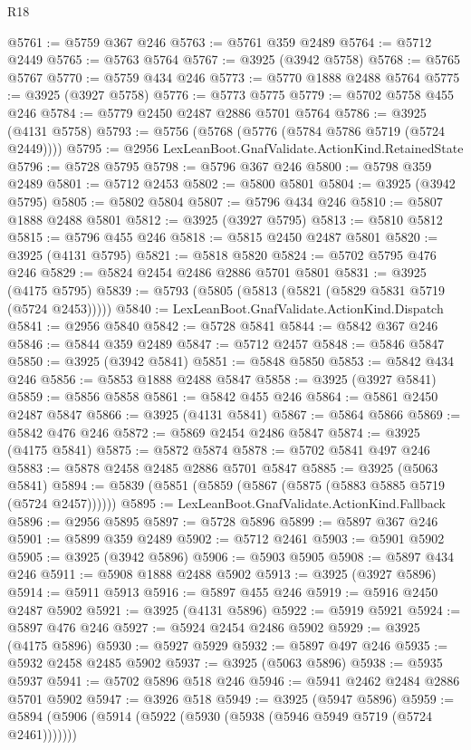 \begin{lexlean}{R18}
\begin{coremodule}
{{{{{{{{{{{{{{{{{{{@5761 := @5759 @367 @246
@5763 := @5761 @359 @2489
@5764 := @5712 @2449
@5765 := @5763 @5764
@5767 := @3925 (@3942 @5758)
@5768 := @5765 @5767
@5770 := @5759 @434 @246
@5773 := @5770 @1888 @2488 @5764
@5775 := @3925 (@3927 @5758)
@5776 := @5773 @5775
@5779 := @5702 @5758 @455 @246
@5784 := @5779 @2450 @2487 @2886 @5701 @5764
@5786 := @3925 (@4131 @5758)
@5793 := @5756 (@5768 (@5776 (@5784 @5786 @5719 (@5724 @2449))))
@5795 := @2956 LexLeanBoot.GnafValidate.ActionKind.RetainedState
@5796 := @5728 @5795
@5798 := @5796 @367 @246
@5800 := @5798 @359 @2489
@5801 := @5712 @2453
@5802 := @5800 @5801
@5804 := @3925 (@3942 @5795)
@5805 := @5802 @5804
@5807 := @5796 @434 @246
@5810 := @5807 @1888 @2488 @5801
@5812 := @3925 (@3927 @5795)
@5813 := @5810 @5812
@5815 := @5796 @455 @246
@5818 := @5815 @2450 @2487 @5801
@5820 := @3925 (@4131 @5795)
@5821 := @5818 @5820
@5824 := @5702 @5795 @476 @246
@5829 := @5824 @2454 @2486 @2886 @5701 @5801
@5831 := @3925 (@4175 @5795)
@5839 := @5793 (@5805 (@5813 (@5821 (@5829 @5831 @5719 (@5724 @2453)))))
@5840 := LexLeanBoot.GnafValidate.ActionKind.Dispatch
@5841 := @2956 @5840
@5842 := @5728 @5841
@5844 := @5842 @367 @246
@5846 := @5844 @359 @2489
@5847 := @5712 @2457
@5848 := @5846 @5847
@5850 := @3925 (@3942 @5841)
@5851 := @5848 @5850
@5853 := @5842 @434 @246
@5856 := @5853 @1888 @2488 @5847
@5858 := @3925 (@3927 @5841)
@5859 := @5856 @5858
@5861 := @5842 @455 @246
@5864 := @5861 @2450 @2487 @5847
@5866 := @3925 (@4131 @5841)
@5867 := @5864 @5866
@5869 := @5842 @476 @246
@5872 := @5869 @2454 @2486 @5847
@5874 := @3925 (@4175 @5841)
@5875 := @5872 @5874
@5878 := @5702 @5841 @497 @246
@5883 := @5878 @2458 @2485 @2886 @5701 @5847
@5885 := @3925 (@5063 @5841)
@5894 := @5839 (@5851 (@5859 (@5867 (@5875 (@5883 @5885 @5719 (@5724 @2457))))))
@5895 := LexLeanBoot.GnafValidate.ActionKind.Fallback
@5896 := @2956 @5895
@5897 := @5728 @5896
@5899 := @5897 @367 @246
@5901 := @5899 @359 @2489
@5902 := @5712 @2461
@5903 := @5901 @5902
@5905 := @3925 (@3942 @5896)
@5906 := @5903 @5905
@5908 := @5897 @434 @246
@5911 := @5908 @1888 @2488 @5902
@5913 := @3925 (@3927 @5896)
@5914 := @5911 @5913
@5916 := @5897 @455 @246
@5919 := @5916 @2450 @2487 @5902
@5921 := @3925 (@4131 @5896)
@5922 := @5919 @5921
@5924 := @5897 @476 @246
@5927 := @5924 @2454 @2486 @5902
@5929 := @3925 (@4175 @5896)
@5930 := @5927 @5929
@5932 := @5897 @497 @246
@5935 := @5932 @2458 @2485 @5902
@5937 := @3925 (@5063 @5896)
@5938 := @5935 @5937
@5941 := @5702 @5896 @518 @246
@5946 := @5941 @2462 @2484 @2886 @5701 @5902
@5947 := @3926 @518
@5949 := @3925 (@5947 @5896)
@5959 := @5894 (@5906 (@5914 (@5922 (@5930 (@5938 (@5946 @5949 @5719 (@5724 @2461)))))))
}}}}}}}}}}}}}}}}}}}
\end{coremodule}
\end{lexlean}
